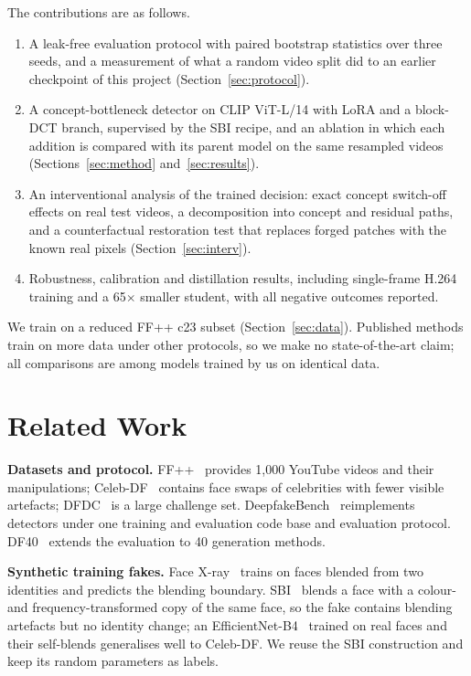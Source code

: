 \documentclass[conference]{IEEEtran}
\begin{document}
The contributions are as follows.
\begin{enumerate}
\item A leak-free evaluation protocol with paired bootstrap statistics over three seeds, and a measurement of what a
random video split did to an earlier checkpoint of this project (Section~\ref{sec:protocol}).
\item A concept-bottleneck detector on CLIP ViT-L/14 with LoRA and a block-DCT branch, supervised by the SBI recipe,
and an ablation in which each addition is compared with its parent model on the same resampled videos
(Sections~\ref{sec:method} and~\ref{sec:results}).
\item An interventional analysis of the trained decision: exact concept switch-off effects on real test videos, a
decomposition into concept and residual paths, and a counterfactual restoration test that replaces forged patches
with the known real pixels (Section~\ref{sec:interv}).
\item Robustness, calibration and distillation results, including single-frame H.264 training and a 65$\times$
smaller student, with all negative outcomes reported.
\end{enumerate}
We train on a reduced FF++ c23 subset (Section~\ref{sec:data}). Published methods train on more data under other
protocols, so we make no state-of-the-art claim; all comparisons are among models trained by us on identical data.

\section{Related Work}\label{sec:related}

\textbf{Datasets and protocol.} FF++~\cite{ffpp} provides 1,000 YouTube videos and their manipulations;
Celeb-DF~\cite{celebdf} contains face swaps of celebrities with fewer visible artefacts; DFDC~\cite{dfdc} is a large
challenge set. DeepfakeBench~\cite{deepfakebench} reimplements detectors under one training and evaluation code
base and evaluation protocol. DF40~\cite{df40} extends the evaluation to 40 generation methods.

\textbf{Synthetic training fakes.} Face X-ray~\cite{facexray} trains on faces blended from two identities and
predicts the blending boundary. SBI~\cite{sbi} blends a face with a colour- and frequency-transformed copy of the same
face, so the fake contains blending artefacts but no identity change; an EfficientNet-B4~\cite{efficientnet} trained
on real faces and their self-blends generalises well to Celeb-DF. We reuse the SBI construction and keep its random
parameters as labels.
\end{document}
